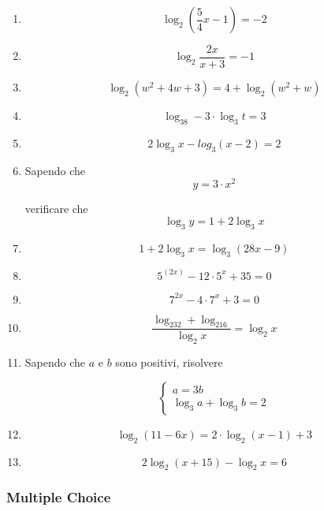\begin{enumerate}[label={Esercizio \arabic* },wide = 1cm, font =\bfseries]

\item 
\[
\log_2\left(\frac{5}{4}x-1\right)=-2
\]

\item 
\[
\log_2\frac{2x}{x+3}=-1
\]

\item 
\[
\log_2(w^2+4w+3)=4+\log_2(w^2+w)
\]

\item \[
\log_38-3\cdot\log_3t=3
\]

\item \[
2\log_3 x-log_3(x-2)=2
\]


\item Sapendo che \[
y=3\cdot x^2
\]

verificare che \[
\log_3 y = 1 + 2\log_3 x
\]

\item \[
1+2\log_3 x = \log_3 (28x -9)
\]


\item \[
5^{(2x)}-12\cdot 5^x + 35 = 0
\]

\item \[
7^{2x}-4\cdot 7^x+3=0
\]


\item\[
\frac{
\log_232+\log_216
}{
\log_2x
}=\log_2x
\]

\item Sapendo che $a$ e $b$ sono positivi, risolvere

\[
\left\{
\begin{array}{ll}
a = 3b\\
\log_3 a + \log_3 b = 2
\end{array}
\right.
\]


\item \[
\log_2(11-6x) = 2\cdot \log_2(x-1)+3
\]

\item \[
2\log_2(x+15)-\log_2x=6
\]



\end{enumerate}


\subsubsection{Multiple Choice}\label{subsec:mult_choice}

